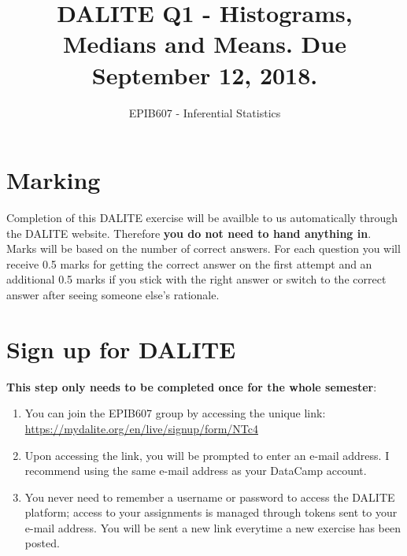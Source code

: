 \documentclass[letterpaper,9pt,twocolumn,twoside,printwatermark=false]{pinp}
\title{DALITE Q1 - Histograms, Medians and Means. Due September 12, 2018.}
\author[a]{EPIB607 - Inferential Statistics}
\affil[a]{Fall 2018, McGill University}
\providecommand{\tightlist}{%
  \setlength{\itemsep}{0pt}\setlength{\parskip}{0pt}}
\begin{document}
\verticaladjustment{-2pt}

\maketitle
\thispagestyle{firststyle}



\section*{Marking}\label{marking}

Completion of this DALITE exercise will be availble to us automatically
through the DALITE website. Therefore \textbf{you do not need to hand
anything in}. Marks will be based on the number of correct answers. For
each question you will receive 0.5 marks for getting the correct answer
on the first attempt and an additional 0.5 marks if you stick with the
right answer or switch to the correct answer after seeing someone else's
rationale.

\section{Sign up for DALITE}\label{sign-up-for-dalite}

\textbf{This step only needs to be completed once for the whole
semester}:

\begin{enumerate}
\def\labelenumi{\arabic{enumi}.}
\tightlist
\item
  You can join the EPIB607 group by accessing the unique link:
  \url{https://mydalite.org/en/live/signup/form/NTc4}
\item
  Upon accessing the link, you will be prompted to enter an e-mail
  address. I recommend using the same e-mail address as your DataCamp
  account.
\item
  You never need to remember a username or password to access the DALITE
  platform; access to your assignments is managed through tokens sent to
  your e-mail address. You will be sent a new link everytime a new
  exercise has been posted.
\end{enumerate}
\end{document}
